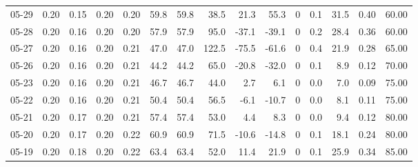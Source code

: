 \begin{threeparttable}
{\begin{tabular}{lrrrrrrrrrrrrrr}
  05-29 &          0.20 &          0.15 &          0.20 &        0.20 &                59.8 &               59.8 &                38.5 &       21.3 &         55.3 &              0 &                 0.1 &             31.5 &            0.40 &                  60.00 \\
  05-28 &          0.20 &          0.16 &          0.20 &        0.20 &                57.9 &               57.9 &                95.0 &      -37.1 &        -39.1 &              0 &                 0.2 &             28.4 &            0.36 &                  60.00 \\
  05-27 &          0.20 &          0.16 &          0.20 &        0.21 &                47.0 &               47.0 &               122.5 &      -75.5 &        -61.6 &              0 &                 0.4 &             21.9 &            0.28 &                  65.00 \\
  05-26 &          0.20 &          0.16 &          0.20 &        0.21 &                44.2 &               44.2 &                65.0 &      -20.8 &        -32.0 &              0 &                 0.1 &              8.9 &            0.12 &                  70.00 \\
  05-23 &          0.20 &          0.16 &          0.20 &        0.21 &                46.7 &               46.7 &                44.0 &        2.7 &          6.1 &              0 &                 0.0 &              7.0 &            0.09 &                  75.00 \\
  05-22 &          0.20 &          0.16 &          0.20 &        0.21 &                50.4 &               50.4 &                56.5 &       -6.1 &        -10.7 &              0 &                 0.0 &              8.1 &            0.11 &                  75.00 \\
  05-21 &          0.20 &          0.17 &          0.20 &        0.21 &                57.4 &               57.4 &                53.0 &        4.4 &          8.3 &              0 &                 0.0 &              9.4 &            0.12 &                  80.00 \\
  05-20 &          0.20 &          0.17 &          0.20 &        0.22 &                60.9 &               60.9 &                71.5 &      -10.6 &        -14.8 &              0 &                 0.1 &             18.1 &            0.24 &                  80.00 \\
  05-19 &          0.20 &          0.18 &          0.20 &        0.22 &                63.4 &               63.4 &                52.0 &       11.4 &         21.9 &              0 &                 0.1 &             25.9 &            0.34 &                  85.00 \\

\end{tabular}}
\end{threeparttable}
